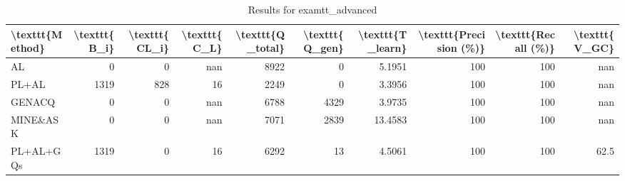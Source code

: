 \begin{table}[ht]
\caption{Results for examtt_advanced}
\begin{tabular}{lrrrrrrrrr}
\hline
 \textbackslash{}texttt\{Method\}   &   \textbackslash{}texttt\{B\_i\} &   \textbackslash{}texttt\{CL\_i\} &   \textbackslash{}texttt\{C\_L\} &   \textbackslash{}texttt\{Q\_total\} &   \textbackslash{}texttt\{Q\_gen\} &   \textbackslash{}texttt\{T\_learn\} &   \textbackslash{}texttt\{Precision (\%)\} &   \textbackslash{}texttt\{Recall (\%)\} &   \textbackslash{}texttt\{V\_GC\} \\
\hline
 AL                &              0 &               0 &            nan &               8922 &                0 &             5.1951 &                      100 &                   100 &           nan   \\
 PL+AL             &           1319 &             828 &             16 &               2249 &                0 &             3.3956 &                      100 &                   100 &           nan   \\
 GENACQ            &              0 &               0 &            nan &               6788 &             4329 &             3.9735 &                      100 &                   100 &           nan   \\
 MINE\&ASK          &              0 &               0 &            nan &               7071 &             2839 &            13.4583 &                      100 &                   100 &           nan   \\
 PL+AL+GQs         &           1319 &               0 &             16 &               6292 &               13 &             4.5061 &                      100 &                   100 &            62.5 \\
\hline
\end{tabular}
\end{table}